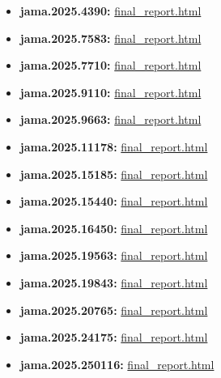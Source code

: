 \documentclass[
  letterpaper,
  9pt]{extreport}
\providecommand{\tightlist}{%
  \setlength{\itemsep}{0pt}\setlength{\parskip}{0pt}}
\begin{document}
\begin{itemize}
\tightlist
\item
  \textbf{jama.2025.4390:}
  \href{jama.2025.4390/.ai_paper_validation/final_report.html}{final\_report.html}
\item
  \textbf{jama.2025.7583:}
  \href{jama.2025.7583/.ai_paper_validation/final_report.html}{final\_report.html}
\item
  \textbf{jama.2025.7710:}
  \href{jama.2025.7710/.ai_paper_validation/final_report.html}{final\_report.html}
\item
  \textbf{jama.2025.9110:}
  \href{jama.2025.9110/.ai_paper_validation/final_report.html}{final\_report.html}
\item
  \textbf{jama.2025.9663:}
  \href{jama.2025.9663/.ai_paper_validation/final_report.html}{final\_report.html}
\item
  \textbf{jama.2025.11178:}
  \href{jama.2025.11178/.ai_paper_validation/final_report.html}{final\_report.html}
\item
  \textbf{jama.2025.15185:}
  \href{jama.2025.15185/.ai_paper_validation/final_report.html}{final\_report.html}
\item
  \textbf{jama.2025.15440:}
  \href{jama.2025.15440/.ai_paper_validation/final_report.html}{final\_report.html}
\item
  \textbf{jama.2025.16450:}
  \href{jama.2025.16450/.ai_paper_validation/final_report.html}{final\_report.html}
\item
  \textbf{jama.2025.19563:}
  \href{jama.2025.19563/.ai_paper_validation/final_report.html}{final\_report.html}
\item
  \textbf{jama.2025.19843:}
  \href{jama.2025.19843/.ai_paper_validation/final_report.html}{final\_report.html}
\item
  \textbf{jama.2025.20765:}
  \href{jama.2025.20765/.ai_paper_validation/final_report.html}{final\_report.html}
\item
  \textbf{jama.2025.24175:}
  \href{jama.2025.24175/.ai_paper_validation/final_report.html}{final\_report.html}
\item
  \textbf{jama.2025.250116:}
  \href{jama.2025.250116/.ai_paper_validation/final_report.html}{final\_report.html}
\end{itemize}
\end{document}
